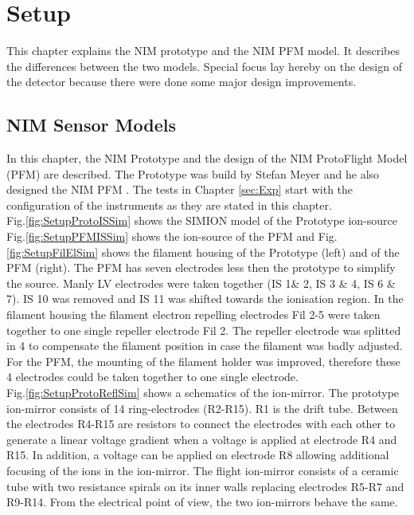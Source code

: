 \section{Setup}\label{sec:setup}
	

	This chapter explains the NIM prototype and the NIM PFM model. It describes the differences between the two models. Special focus lay hereby on the design of the detector because there were done some major design improvements.
	
	
	\subsection{NIM Sensor Models }\label{subsec:setupInst}
	In this chapter, the NIM Prototype and the design of the NIM ProtoFlight Model (PFM) are described. The Prototype was build by Stefan Meyer and he also designed the NIM PFM \cite{Diss_Meyer}. The tests in Chapter \ref{sec:Exp} start with the configuration of the instruments as they are stated in this chapter.\\
	Fig.\ref{fig:SetupProtoISSim} shows the SIMION model of the Prototype ion-source Fig.\ref{fig:SetupPFMISSim} shows the ion-source of the PFM and Fig.\ref{fig:SetupFilElSim} shows the filament housing of the Prototype (left) and of the PFM (right). The PFM has seven electrodes less then the prototype to simplify the source. Manly LV electrodes were taken together (IS 1\& 2, IS 3 \& 4, IS 6 \& 7). IS 10 was removed and IS 11 was shifted towards the ionisation region. In the filament housing the filament electron repelling electrodes Fil 2-5 were taken together to one single repeller electrode Fil 2. The repeller electrode was splitted in 4 to compensate the filament position in case the filament was badly adjusted. For the PFM, the mounting of the filament holder was improved, therefore these 4 electrodes could be taken together to one single electrode.\\
	Fig.\ref{fig:SetupProtoReflSim} shows a schematics of the ion-mirror. The prototype ion-mirror consists of 14 ring-electrodes (R2-R15). R1 is the drift tube. Between the electrodes R4-R15 are resistors to connect the electrodes with each other to generate a linear voltage gradient when a voltage is applied at electrode R4 and R15. In addition, a voltage can be applied on electrode R8 allowing additional focusing of the ions in the ion-mirror.	The flight ion-mirror consists of a ceramic tube with two resistance spirals on its inner walls replacing electrodes R5-R7 and R9-R14. From the electrical point of view, the two ion-mirrors behave the same.
	
